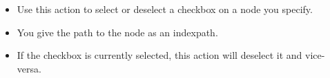 
\begin{itemize}
\item Use this action to select or deselect a checkbox on a node you specify. 
\item You give the path to the node as an indexpath. 
\item If the checkbox is currently selected, this action will deselect it and vice-versa.
\end{itemize}
